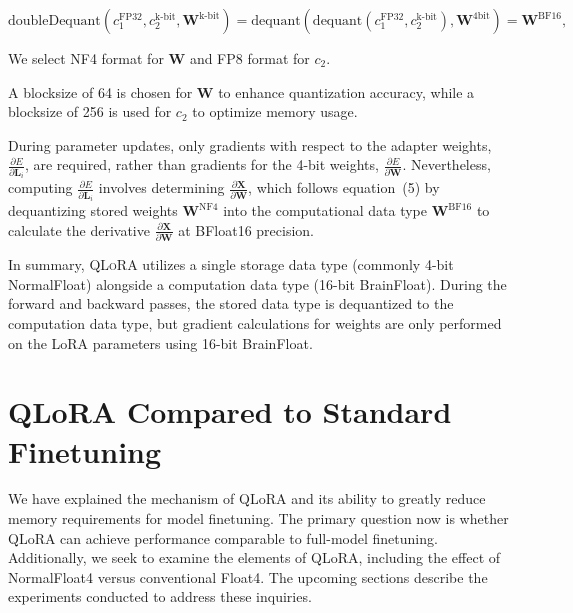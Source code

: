 \begin{equation}
    \text{doubleDequant}(c_1^{\text{FP32}}, c_2^{\text{k-bit}}, \mathbf{W}^{\text{k-bit}}) = \text{dequant}(\text{dequant}(c_1^{\text{FP32}}, c_2^{\text{k-bit}}), \mathbf{W}^{\text{4bit}}) = \mathbf{W}^{\text{BF16}},
\end{equation}

We select NF4 format for $\mathbf{W}$ and FP8 format for $c_2$.

A blocksize of 64 is chosen for $\mathbf{W}$ to enhance quantization accuracy, while a blocksize of 256 is used for $c_2$ to optimize memory usage.

During parameter updates, only gradients with respect to the adapter weights, $\frac{\partial E}{\partial \mathbf{L}_i}$, are required, rather than gradients for the 4-bit weights, $\frac{\partial E}{\partial \mathbf{W}}$. Nevertheless, computing $\frac{\partial E}{\partial \mathbf{L}_i}$ involves determining $\frac{\partial \mathbf{X}}{\partial \mathbf{W}}$, which follows equation~(5) by dequantizing stored weights $\mathbf{W}^{\text{NF4}}$ into the computational data type $\mathbf{W}^{\text{BF16}}$ to calculate the derivative $\frac{\partial \mathbf{X}}{\partial \mathbf{W}}$ at BFloat16 precision.

In summary, \textsc{QLoRA} utilizes a single storage data type (commonly 4-bit NormalFloat) alongside a computation data type (16-bit BrainFloat). During the forward and backward passes, the stored data type is dequantized to the computation data type, but gradient calculations for weights are only performed on the LoRA parameters using 16-bit BrainFloat.

\section{QLoRA Compared to Standard Finetuning}
\label{sec:comp_to_std}

We have explained the mechanism of QLoRA and its ability to greatly reduce memory requirements for model finetuning. The primary question now is whether QLoRA can achieve performance comparable to full-model finetuning. Additionally, we seek to examine the elements of QLoRA, including the effect of NormalFloat4 versus conventional Float4. The upcoming sections describe the experiments conducted to address these inquiries.


